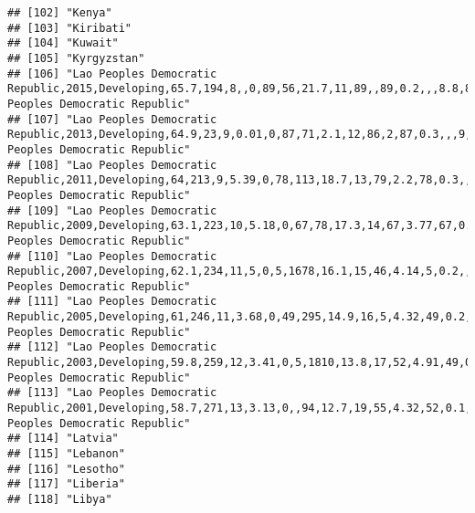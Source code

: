 \documentclass[
]{article}
\begin{document}
\begin{verbatim}
## [102] "Kenya"                                                                                                                                                
## [103] "Kiribati"                                                                                                                                             
## [104] "Kuwait"                                                                                                                                               
## [105] "Kyrgyzstan"                                                                                                                                           
## [106] "Lao Peoples Democratic Republic,2015,Developing,65.7,194,8,,0,89,56,21.7,11,89,,89,0.2,,,8.8,8.9,0.582,10.8\nLao Peoples Democratic Republic"         
## [107] "Lao Peoples Democratic Republic,2013,Developing,64.9,23,9,0.01,0,87,71,2.1,12,86,2,87,0.3,,,9,9.1,0.563,10.4\nLao Peoples Democratic Republic"        
## [108] "Lao Peoples Democratic Republic,2011,Developing,64,213,9,5.39,0,78,113,18.7,13,79,2.2,78,0.3,,,9.2,9.4,0.542,9.9\nLao Peoples Democratic Republic"    
## [109] "Lao Peoples Democratic Republic,2009,Developing,63.1,223,10,5.18,0,67,78,17.3,14,67,3.77,67,0.2,,,9.4,9.6,0.525,9.4\nLao Peoples Democratic Republic" 
## [110] "Lao Peoples Democratic Republic,2007,Developing,62.1,234,11,5,0,5,1678,16.1,15,46,4.14,5,0.2,,,9.7,9.8,0.509,9\nLao Peoples Democratic Republic"      
## [111] "Lao Peoples Democratic Republic,2005,Developing,61,246,11,3.68,0,49,295,14.9,16,5,4.32,49,0.2,,,1,1.1,0.494,8.7\nLao Peoples Democratic Republic"     
## [112] "Lao Peoples Democratic Republic,2003,Developing,59.8,259,12,3.41,0,5,1810,13.8,17,52,4.91,49,0.1,,,1.2,1.3,0.477,8.3\nLao Peoples Democratic Republic"
## [113] "Lao Peoples Democratic Republic,2001,Developing,58.7,271,13,3.13,0,,94,12.7,19,55,4.32,52,0.1,,,1.4,1.5,0.463,8\nLao Peoples Democratic Republic"     
## [114] "Latvia"                                                                                                                                               
## [115] "Lebanon"                                                                                                                                              
## [116] "Lesotho"                                                                                                                                              
## [117] "Liberia"                                                                                                                                              
## [118] "Libya"                                                                                                                                                

\end{verbatim}
\end{document}

